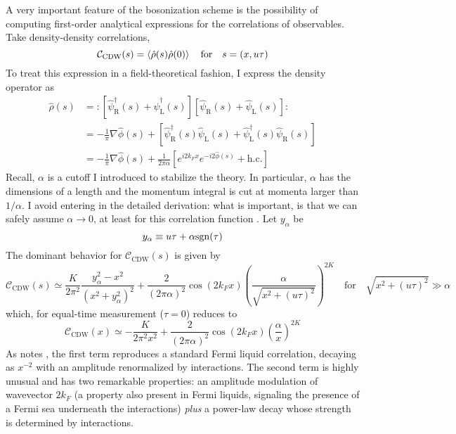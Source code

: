 A very important feature of the bosonization scheme is the possibility of computing first-order analytical expressions for the correlations of observables. Take density-density correlations,
\[
	\mathcal{C}_\mathrm{CDW}(s) = \ev{\hat \rho(s) \hat \rho(0)}
	\quad\text{for}\quad
	s = (x,u\tau)
\]
To treat this expression in a field-theoretical fashion, I express the density operator as
\[
	\begin{aligned}
		\hat \rho(s) &= \colon \left[
			\hat \psi_\mathrm{R}^\dagger(s) + \hat \psi_\mathrm{L}^\dagger(s)
		\right] \left[
			\hat \psi_\mathrm{R}(s) + \hat \psi_\mathrm{L}(s)
		\right] \colon \\
		&= - \frac{1}{\pi} \nabla \hat \phi(s) + \left[
			\hat \psi_\mathrm{R}^\dagger(s) \hat \psi_\mathrm{L}(s) + \hat \psi_\mathrm{L}^\dagger(s) \hat \psi_\mathrm{R}(s) 
		\right] \\
		&= - \frac{1}{\pi} \nabla \hat \phi(s) + \frac{1}{2\pi\alpha} \left[
			e^{i 2k_F x} e^{-i 2 \hat \phi(s)}
			+ \mathrm{h.c.}
		\right]
	\end{aligned}
\]
Recall, $\alpha$ is a cutoff I introduced to stabilize the theory. In particular, $\alpha$ has the dimensions of a length and the momentum integral is cut at momenta larger than $1/\alpha$. I avoid entering in the detailed derivation: what is important, is that we can safely assume $\alpha \to 0$, at least for this correlation function \cite{haldane1981luttinger}. Let $y_\alpha$ be
\[
	y_\alpha \equiv u\tau + \alpha \mathrm{sgn}(\tau)
\]
The dominant behavior for $\mathcal{C}_\mathrm{CDW}(s)$ is given by
\[
	\mathcal{C}_\mathrm{CDW}(s) \simeq \frac{K}{2\pi^2} \frac{y_\alpha^2 - x^2}{(x^2 + y_\alpha^2)^2} + \frac{2}{(2\pi\alpha)^2} \cos\left(2k_F x\right) \left(
		\frac{\alpha}{\sqrt{x^2 + (u\tau)^2}}
	\right)^{2K}
	\quad\text{for}\quad \sqrt{x^2 + (u\tau)^2} \gg \alpha
\]
which, for equal-time measurement ($\tau=0$) reduces to
\begin{equation}\label{eq:density-density-correlation-power-law}
	\mathcal{C}_\mathrm{CDW}(x) \simeq - \frac{K}{2\pi^2 x^2} +  \frac{2}{(2\pi\alpha)^2} \cos\left(2k_F x\right) \left(
		\frac{\alpha}{x}
	\right)^{2K}
\end{equation}
As \citeauthor{giamarchi2003quantum} notes \cite[Sec.~2.2.2]{giamarchi2003quantum}, the first term reproduces a standard Fermi liquid correlation, decaying as $x^{-2}$ with an amplitude renormalized by interactions. The second term is highly unusual and has two remarkable properties: an amplitude modulation of wavevector $2k_F$ (a property also present in Fermi liquids, signaling the presence of a Fermi sea underneath the interactions) \textit{plus} a power-law decay whose strength is determined by interactions.


